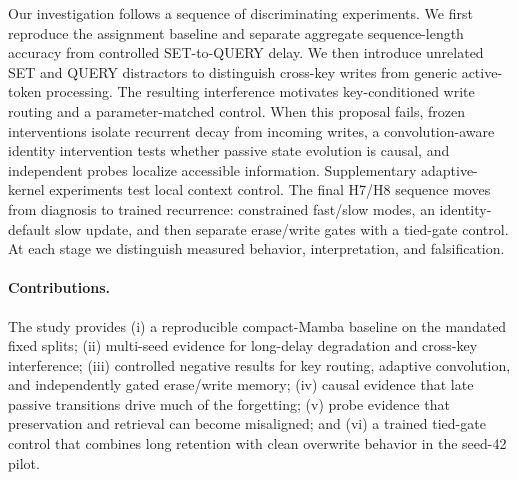 \documentclass[10pt,a4paper]{article}
\begin{document}
Our investigation follows a sequence of discriminating experiments. We first reproduce the assignment baseline and separate aggregate sequence-length accuracy from controlled SET-to-QUERY delay. We then introduce unrelated SET and QUERY distractors to distinguish cross-key writes from generic active-token processing. The resulting interference motivates key-conditioned write routing and a parameter-matched control. When this proposal fails, frozen interventions isolate recurrent decay from incoming writes, a convolution-aware identity intervention tests whether passive state evolution is causal, and independent probes localize accessible information. Supplementary adaptive-kernel experiments test local context control. The final H7/H8 sequence moves from diagnosis to trained recurrence: constrained fast/slow modes, an identity-default slow update, and then separate erase/write gates with a tied-gate control. At each stage we distinguish measured behavior, interpretation, and falsification.

\paragraph{Contributions.} The study provides (i) a reproducible compact-Mamba baseline on the mandated fixed splits; (ii) multi-seed evidence for long-delay degradation and cross-key interference; (iii) controlled negative results for key routing, adaptive convolution, and independently gated erase/write memory; (iv) causal evidence that late passive transitions drive much of the forgetting; (v) probe evidence that preservation and retrieval can become misaligned; and (vi) a trained tied-gate control that combines long retention with clean overwrite behavior in the seed-42 pilot.
\end{document}
